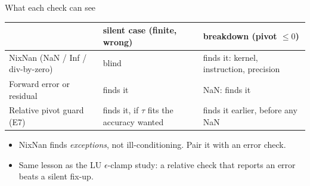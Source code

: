 \documentclass[aspectratio=169,10pt,xcolor=table]{beamer}
\begin{document}
\begin{frame}{What each check can see}
\centering\small
\begin{tabular}{p{4.3cm}p{4.3cm}p{4.6cm}}
\toprule
 & silent case (finite, wrong) & breakdown (pivot $\le0$)\\
\midrule
NixNan (NaN / Inf / div-by-zero) & \cellcolor{red!25}blind & \cellcolor{green!15}finds it: kernel, instruction, precision\\
Forward error or residual & \cellcolor{green!15}finds it & \cellcolor{green!15}NaN: finds it\\
Relative pivot guard (E7) & \cellcolor{green!15}finds it, if $\tau$ fits the accuracy wanted & \cellcolor{green!15}finds it earlier, before any NaN\\
\bottomrule
\end{tabular}

\vspace{5mm}

\vspace{4mm}\footnotesize\raggedright
\begin{itemize}
\item NixNan finds \emph{exceptions}, not ill-conditioning. Pair it with an error check.
\item Same lesson as the LU $\epsilon$-clamp study: a relative check that reports an error beats a silent fix-up.
\end{itemize}
\end{frame}
\end{document}
